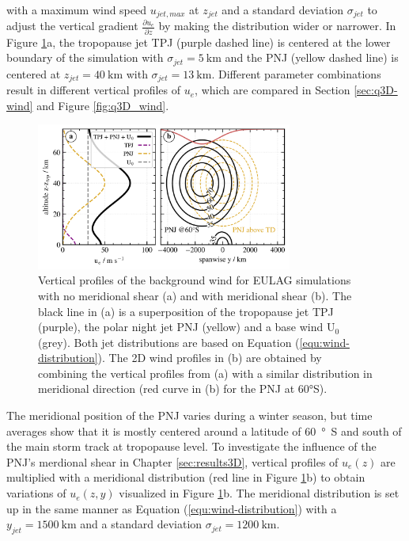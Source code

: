 with a maximum wind speed $u_{jet,max}$ at $z_{jet}$ and a standard deviation $\sigma_{jet}$ to adjust the vertical gradient $\frac{\partial u_e}{\partial z}$ by making the distribution wider or narrower. In Figure \ref{fig:wind_profs}a, the tropopause jet TPJ (purple dashed line) is centered at the lower boundary of the simulation with $\sigma_{jet}=\SI{5}{\kilo\meter}$ and the PNJ (yellow dashed line) is centered at $z_{jet}=\SI{40}{\kilo\meter}$ with $\sigma_{jet}=\SI{13}{\kilo\meter}$. Different parameter combinations result in different vertical profiles of $u_e$, which are compared in Section \ref{sec:q3D-wind} and Figure \ref{fig:q3D_wind}.

\begin{figure}[tbp]
    \centering
    \includegraphics[width=0.75\textwidth]{figures_model/eulag-wind-profiles.png}
    \caption{Vertical profiles of the background wind for EULAG simulations with no meridional shear (a) and with meridional shear (b). The black line in (a) is a superposition of the tropopause jet TPJ (purple), the polar night jet PNJ (yellow) and a base wind U$_0$ (grey). Both jet distributions are based on Equation (\ref{equ:wind-distribution}). The 2D wind profiles in (b) are obtained by combining the vertical profiles from (a) with a similar distribution in meridional direction (red curve in (b) for the PNJ at 60°S).}
    \label{fig:wind_profs}
\end{figure} 
%
The meridional position of the PNJ varies during a winter season, but time averages show that it is mostly centered around a latitude of \SI{60}{\degree S} and south of the main storm track at tropopause level. To investigate the influence of the PNJ's merdional shear in Chapter \ref{sec:results3D}, vertical profiles of $u_e(z)$ are multiplied with a meridional distribution (red line in Figure \ref{fig:wind_profs}b) to obtain variations of $u_e(z,y)$ visualized in Figure \ref{fig:wind_profs}b. The meridional distribution is set up in the same manner as Equation (\ref{equ:wind-distribution}) with a $y_{jet}=\SI{1500}{\kilo\meter}$ and a standard deviation $\sigma_{jet}=\SI{1200}{\kilo\meter}$.

